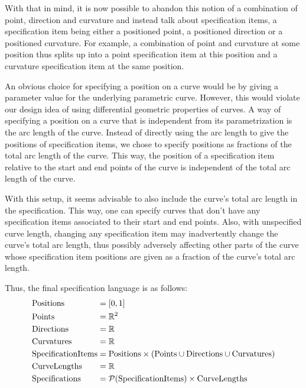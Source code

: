 \documentclass[a4paper]{article}
\begin{document}
				With that in mind, it is now possible to abandon this notion of a combination of point, direction and curvature and instead talk about specification items, a specification item being either a positioned point, a positioned direction or a positioned curvature. For example, a combination of point and curvature at some position thus splits up into a point specification item at this position and a curvature specification item at the same position.

				An obvious choice for specifying a position on a curve would be by giving a parameter value for the underlying parametric curve. However, this would violate our design idea of using differential geometric properties of curves. A way of specifying a position on a curve that is independent from its parametrization is the arc length of the curve. Instead of directly using the arc length to give the positions of specification items, we chose to specify positions as fractions of the total arc length of the curve. This way, the position of a specification item relative to the start and end points of the curve is independent of the total arc length of the curve.

				With this setup, it seems advisable to also include the curve's total arc length in the specification. This way, one can specify curves that don't have any specification items associated to their start and end points. Also, with unspecified curve length, changing any specification item may inadvertently change the curve's total arc length, thus possibly adversely affecting other parts of the curve whose specification item positions are given as a fraction of the curve's total arc length.

				Thus, the final specification language is as follows:
				\begin{equation*}
					\begin{alignedat}{2}
						& \mathrm{Positions}          && = \left[ 0,1 \right]\\
						& \mathrm{Points}             && = \mathbb{R}^{2}\\
						& \mathrm{Directions}         && = \mathbb{R}\\
						& \mathrm{Curvatures}         && = \mathbb{R}\\
						& \mathrm{SpecificationItems} && = \mathrm{Positions} \times \left(\mathrm{Points} \cup \mathrm{Directions} \cup \mathrm{Curvatures}\right)\\
						& \mathrm{CurveLengths}       && = \mathbb{R}\\
						& \mathrm{Specifications}     && = \mathcal{P}\!\left( \mathrm{SpecificationItems} \right) \times \mathrm{CurveLengths}
					\end{alignedat}
				\end{equation*}
\end{document}
